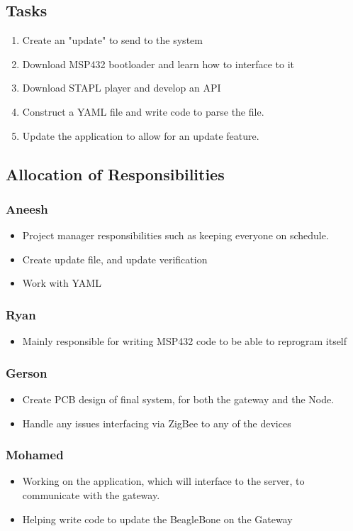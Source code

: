 \documentclass[11pt]{article}
\begin{document}
\subsection{Tasks} 
\begin{enumerate}
\item Create an "update" to send to the system
\item Download MSP432 bootloader and learn how to interface to it
\item Download STAPL player and develop an API 
\item Construct a YAML file and write code to parse the file. 
\item Update the application to allow for an update feature.
\end{enumerate}

\subsection{Allocation of Responsibilities} 

\subsubsection{Aneesh}
\begin{itemize}
\item Project manager responsibilities such as keeping everyone on schedule.
\item Create update file, and update verification
\item Work with YAML 
\end{itemize}
\subsubsection{Ryan}
\begin{itemize}
\item Mainly responsible for writing MSP432 code to be able to reprogram itself
\end{itemize}

\subsubsection{Gerson}
\begin{itemize}
\item Create PCB design of final system, for both the gateway and the Node. 
\item Handle any issues interfacing via ZigBee to any of the devices
\end{itemize}
\subsubsection{Mohamed}
\begin{itemize}
\item Working on the application, which will interface to the server, to communicate with the gateway. 
\item Helping write code to update the BeagleBone on the Gateway
\end{itemize}
\end{document}

